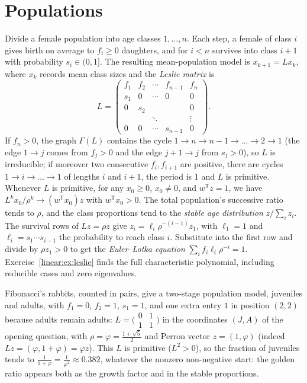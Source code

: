 \section{Populations}

\begin{example}\label{linear:exa:leslie}
Divide a female population into age classes $1,\dots,n$. Each step, a female of class $i$ gives birth on average to $f_i\ge0$
daughters, and for $i<n$ survives into class $i+1$ with probability $s_i\in(0,1]$. The resulting mean-population model is
$x_{k+1}=Lx_k$, where $x_k$ records mean class sizes and the \emph{Leslie matrix} is
\[
L=\begin{pmatrix}f_1&f_2&\cdots&f_{n-1}&f_n\\s_1&0&\cdots&0&0\\0&s_2&&&0\\&&\ddots&&\vdots\\0&0&\cdots&s_{n-1}&0\end{pmatrix}.
\]
If $f_n>0$, the graph $\Gamma(L)$ contains the cycle $1\to n\to n-1\to\dots\to2\to1$ (the edge $1\to j$ comes from
$f_j>0$ and the edge $j+1\to j$ from $s_j>0$), so $L$ is irreducible; if moreover two consecutive $f_i,f_{i+1}$ are positive,
there are cycles $1\to i\to\dots\to1$ of lengths $i$ and $i+1$, the period is $1$ and $L$ is primitive.
Whenever $L$ is primitive, for any $x_0\ge0$, $x_0\ne0$, and
$w^{\mathsf T}z=1$, we have
$L^kx_0/\rho^k\to(w^{\mathsf T}x_0)z$ with $w^{\mathsf T}x_0>0$.
The total population's successive ratio tends to $\rho$, and the class
proportions tend to the \emph{stable age distribution} $z/\sum_i z_i$.
The survival rows of $Lz=\rho z$ give
$z_i=\ell_i\rho^{-(i-1)}z_1$, with $\ell_1=1$ and
$\ell_i=s_1\cdots s_{i-1}$ the probability to reach class $i$.
Substitute into the first row and divide by $\rho z_1>0$ to get the
\emph{Euler--Lotka equation} $\sum_i f_i\ell_i\rho^{-i}=1$.
Exercise~\ref{linear:ex:leslie} finds the full characteristic polynomial,
including reducible cases and zero eigenvalues.

Fibonacci's rabbits, counted in pairs, give a two-stage population model,
juveniles and adults, with $f_1=0$,
$f_2=1$, $s_1=1$, and one extra entry $1$ in position $(2,2)$ because adults remain adults:
$L=\bigl(\begin{smallmatrix}0&1\\1&1\end{smallmatrix}\bigr)$ in the coordinates $(J,A)$ of the opening question, with
$\rho=\varphi=\frac{1+\sqrt5}2$ and Perron vector $z=(1,\varphi)$ (indeed $Lz=(\varphi,1+\varphi)=\varphi z$). This $L$ is
primitive ($L^2>0$), so the fraction of juveniles tends to $\frac1{1+\varphi}=\frac1{\varphi^2}\approx0.382$, whatever the
nonzero non-negative start: the golden ratio appears both as the growth
factor and in the stable proportions.
\end{example}

